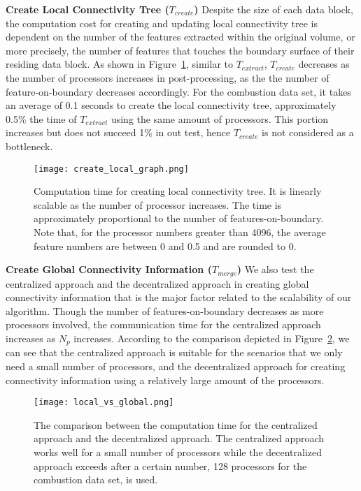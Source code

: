 \textbf{Create Local Connectivity Tree ($T_{create}$)}
%
Despite the size of each data block, the computation cost for creating and updating local connectivity tree is dependent on the number of the features extracted within the original volume, or more precisely, the number of features that touches the boundary surface of their residing data block. As shown in Figure~\ref{fig:create-local-graph}, similar to $T_{extract}$, $T_{create}$ decreases as the number of processors increases in post-processing, as the the number of feature-on-boundary decreases accordingly. For the combustion data set, it takes an average of 0.1 seconds to create the local connectivity tree, approximately 0.5\% the time of $T_{extract}$ using the same amount of processors. This portion increases but does not succeed 1\% in out test, hence $T_{create}$ is not considered as a bottleneck. %

\begin{figure}[t]
\centering
\texttt{[image: create\_local\_graph.png]}
\caption{Computation time for creating local connectivity tree. It is linearly scalable as the number of processor increases. The time is approximately proportional to the number of features-on-boundary. Note that, for the processor numbers greater than 4096, the average feature numbers are between 0 and 0.5 and are rounded to 0.}
\label{fig:create-local-graph}
\end{figure}

\textbf{Create Global Connectivity Information ($T_{merge}$)}
%
We also test the centralized approach and the decentralized approach in creating global connectivity information that is the major factor related to the scalability of our algorithm. Though the number of features-on-boundary decreases as more processors involved, the communication time for the centralized approach increases as $N_p$ increases. According to the comparison depicted in Figure~\ref{fig:local-vs-global}, we can see that the centralized approach is suitable for the scenarios that we only need a small number of processors, and the decentralized approach for creating connectivity information using a relatively large amount of the processors.

\begin{figure}[ht]
\centering
\texttt{[image: local\_vs\_global.png]}
\caption{The comparison between the computation time for the centralized approach and the decentralized approach. The centralized approach works well for a small number of processors while the decentralized approach exceeds after a certain number, 128 processors for the combustion data set, is used.}
\label{fig:local-vs-global}
\end{figure}

